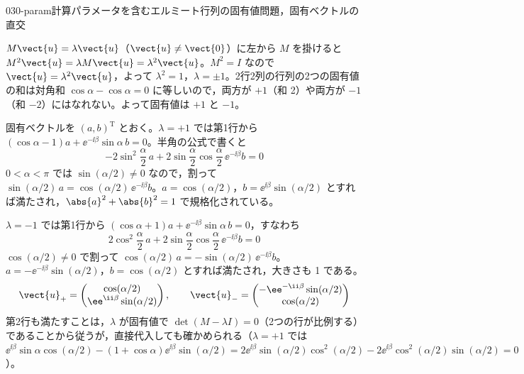 \documentclass[uplatex,dvipdfmx,a4paper,11pt]{jsarticle}
\begin{document}
\begin{mondai}{030-param}{計算}{パラメータを含むエルミート行列の固有値問題，固有ベクトルの直交}
\begin{tadashii}
 $M\vect{u}=\lambda\vect{u}$（$\vect{u}\neq\vect{0}$）に左から $M$ を掛けると $M^{2}\vect{u}=\lambda M\vect{u}=\lambda^{2}\vect{u}$。$M^{2}=I$ なので $\vect{u}=\lambda^{2}\vect{u}$，よって $\lambda^{2}=1$，$\lambda=\pm1$。2行2列の行列の2つの固有値の和は対角和 $\cos\alpha-\cos\alpha=0$ に等しいので，両方が $+1$（和 2）や両方が $-1$（和 $-2$）にはなれない。よって固有値は $+1$ と $-1$。

 固有ベクトルを $(a,b)^{\mathrm{T}}$ とおく。$\lambda=+1$ では第1行から $(\cos\alpha-1)a+\ee^{-\ii\beta}\sin\alpha\,b=0$。半角の公式で書くと
\[ -2\sin^{2}\frac{\alpha}{2}\,a+2\sin\frac{\alpha}{2}\cos\frac{\alpha}{2}\,\ee^{-\ii\beta}b=0 \]
$0<\alpha<\pi$ では $\sin(\alpha/2)\neq 0$ なので，割って $\sin(\alpha/2)\,a=\cos(\alpha/2)\,\ee^{-\ii\beta}b$。$a=\cos(\alpha/2)$，$b=\ee^{\ii\beta}\sin(\alpha/2)$ とすれば満たされ，$\abs{a}^{2}+\abs{b}^{2}=1$ で規格化されている。

$\lambda=-1$ では第1行から $(\cos\alpha+1)a+\ee^{-\ii\beta}\sin\alpha\,b=0$，すなわち
\[ 2\cos^{2}\frac{\alpha}{2}\,a+2\sin\frac{\alpha}{2}\cos\frac{\alpha}{2}\,\ee^{-\ii\beta}b=0 \]
$\cos(\alpha/2)\neq 0$ で割って $\cos(\alpha/2)\,a=-\sin(\alpha/2)\,\ee^{-\ii\beta}b$。$a=-\ee^{-\ii\beta}\sin(\alpha/2)$，$b=\cos(\alpha/2)$ とすれば満たされ，大きさも 1 である。
\[ \vect{u}_{+}=\begin{pmatrix}\cos(\alpha/2)\\ \ee^{\ii\beta}\sin(\alpha/2)\end{pmatrix},\qquad \vect{u}_{-}=\begin{pmatrix}-\ee^{-\ii\beta}\sin(\alpha/2)\\ \cos(\alpha/2)\end{pmatrix} \]
第2行も満たすことは，$\lambda$ が固有値で $\det(M-\lambda I)=0$（2つの行が比例する）であることから従うが，直接代入しても確かめられる（$\lambda=+1$ では $\ee^{\ii\beta}\sin\alpha\cos(\alpha/2)-(1+\cos\alpha)\ee^{\ii\beta}\sin(\alpha/2)=2\ee^{\ii\beta}\sin(\alpha/2)\cos^{2}(\alpha/2)-2\ee^{\ii\beta}\cos^{2}(\alpha/2)\sin(\alpha/2)=0$）。


\end{tadashii}
\end{mondai}
\end{document}
